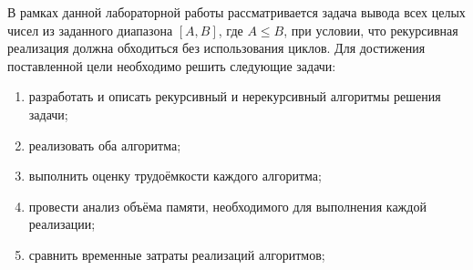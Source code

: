 
В рамках данной лабораторной работы рассматривается задача вывода всех целых чисел из заданного диапазона $[A, B]$, где $A \leq B$, при условии, что рекурсивная реализация должна обходиться без использования циклов. Для достижения поставленной цели необходимо решить следующие задачи:
\begin{enumerate}
	\item разработать и описать рекурсивный и нерекурсивный алгоритмы решения задачи;
	\item реализовать оба алгоритма;
	\item выполнить оценку трудоёмкости каждого алгоритма;
	\item провести анализ объёма памяти, необходимого для выполнения каждой реализации;
	\item сравнить временные затраты реализаций алгоритмов;
\end{enumerate}

\clearpage
